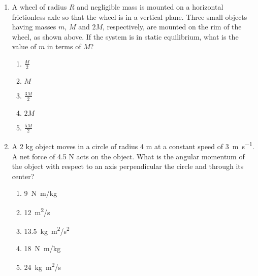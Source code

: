 \documentclass[11pt]{article}
\begin{document}
\begin{multicols}{2}
\begin{enumerate}[leftmargin=18pt,resume]
    \begin{center}
    \end{center}
  \item A wheel of radius $R$ and negligible mass is mounted on a horizontal
    frictionless axle so that the wheel is in a vertical plane. Three small
    objects having masses $m$, $M$ and $2M$, respectively, are mounted on the
    rim of the wheel, as shown above. If the system is in static equilibrium,
    what is the value of $m$ in terms of $M$?
    \begin{enumerate}[nosep,leftmargin=18pt,label=(\Alph*)]
    \item$\displaystyle\frac{M}{2}$
    \item$M$
    \item$\displaystyle\frac{3M}{2}$
    \item$2M$
    \item$\displaystyle\frac{5M}{2}$
    \end{enumerate}
    
  \item A 2 kg object moves in a circle of radius 4 m at a constant speed of
    \SI{3}{\metre\per\second}. A net force of 4.5 N acts on the object. What is
    the angular momentum of the object with respect to an axis perpendicular
    the circle and through its center?
    \begin{enumerate}[nosep,leftmargin=18pt,label=(\Alph*)]
    \item\SI{9}{N.m/kg}
    \item\SI{12}{m^2/s}
    \item\SI{13.5}{kg.m^2/s^2}
    \item\SI{18}{N.m/kg}
    \item\SI{24}{kg.m^2/s}
    \end{enumerate}
    \vspace{.7in}
    

\end{enumerate}
\end{multicols}
\end{document}
